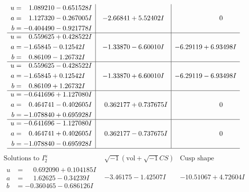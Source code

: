 \documentclass[1p]{elsarticle_modified}
\theoremstyle{definition}
\newcommand{\I}{\sqrt{-1}}
\begin{document}
$$\begin{array}{c|c|c}
\begin{aligned}
u &= \phantom{-}1.089210 - 0.651528 I \\
a &= \phantom{-}1.127320 - 0.267005 I \\
b &= -0.404490 - 0.921778 I\end{aligned}
 & -2.66841 + 5.52402 I & \phantom{-0.000000 } 0 \\ \hline\begin{aligned}
u &= \phantom{-}0.559625 + 0.428522 I \\
a &= -1.65845 - 0.12542 I \\
b &= \phantom{-}0.86109 - 1.26732 I\end{aligned}
 & -1.33870 - 6.60010 I & -6.29119 + 6.93498 I \\ \hline\begin{aligned}
u &= \phantom{-}0.559625 - 0.428522 I \\
a &= -1.65845 + 0.12542 I \\
b &= \phantom{-}0.86109 + 1.26732 I\end{aligned}
 & -1.33870 + 6.60010 I & -6.29119 - 6.93498 I \\ \hline\begin{aligned}
u &= -0.641696 + 1.127080 I \\
a &= \phantom{-}0.464741 - 0.402605 I \\
b &= -1.078840 + 0.695928 I\end{aligned}
 & \phantom{-}0.362177 + 0.737675 I & \phantom{-0.000000 } 0 \\ \hline\begin{aligned}
u &= -0.641696 - 1.127080 I \\
a &= \phantom{-}0.464741 + 0.402605 I \\
b &= -1.078840 - 0.695928 I\end{aligned}
 & \phantom{-}0.362177 - 0.737675 I & \phantom{-0.000000 } 0\\
 \hline 
 \end{array}$$\newpage$$\begin{array}{c|c|c}  
\text{Solutions to }I^u_{2}& \I (\text{vol} + \sqrt{-1}CS) & \text{Cusp shape}\\
 \hline 
\begin{aligned}
u &= \phantom{-}0.692090 + 0.104185 I \\
a &= \phantom{-}1.62625 - 0.34239 I \\
b &= -0.360465 - 0.686126 I\end{aligned}
 & -3.46175 - 1.42507 I & -10.51067 + 4.72604 I \\ \hline\begin{aligned}

\end{aligned}
\end{array}$$
\end{document}
